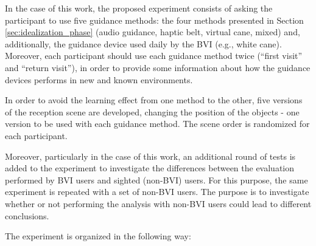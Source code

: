 In the case of this work, the proposed experiment consists of asking the participant to use five guidance methods: the four methods presented in Section \ref{sec:idealization_phase} (audio guidance, haptic belt, virtual cane, mixed) and, additionally, the guidance device used daily by the BVI (e.g., white cane). Moreover, each participant should use each guidance method twice (“first visit” and “return visit”), in order to provide some information about how the guidance devices performs in new and known environments.

In order to avoid the learning effect from one method to the other, five versions of the reception scene are developed, changing the position of the objects - one version to be used with each guidance method. The scene order is randomized for each participant.

Moreover, particularly in the case of this work, an additional round of tests is added to the experiment to investigate the differences between the evaluation performed by BVI users and sighted (non-BVI) users. For this purpose, the same experiment is repeated with a set of non-BVI users. The purpose is to investigate whether or not performing the analysis with non-BVI users could lead to different conclusions.

The experiment is organized in the following way:

